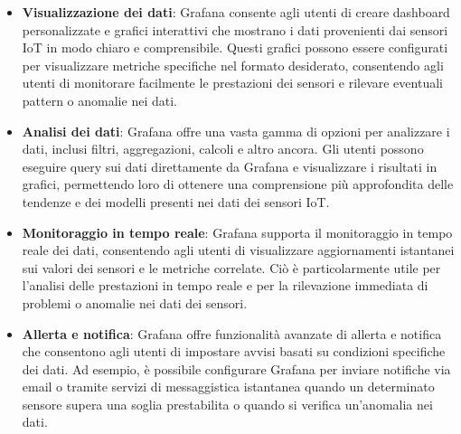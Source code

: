 \begin{itemize}
  \item \textbf{Visualizzazione dei dati}: Grafana consente agli utenti di creare dashboard personalizzate e grafici interattivi che mostrano i dati provenienti dai sensori IoT in modo chiaro e comprensibile. Questi grafici possono essere configurati per visualizzare metriche specifiche nel formato desiderato, consentendo agli utenti di monitorare facilmente le prestazioni dei sensori e rilevare eventuali pattern o anomalie nei dati.
  
  \item \textbf{Analisi dei dati}: Grafana offre una vasta gamma di opzioni per analizzare i dati, inclusi filtri, aggregazioni, calcoli e altro ancora. Gli utenti possono eseguire query sui dati direttamente da Grafana e visualizzare i risultati in grafici, permettendo loro di ottenere una comprensione più approfondita delle tendenze e dei modelli presenti nei dati dei sensori IoT.
  
  \item \textbf{Monitoraggio in tempo reale}: Grafana supporta il monitoraggio in tempo reale dei dati, consentendo agli utenti di visualizzare aggiornamenti istantanei sui valori dei sensori e le metriche correlate. Ciò è particolarmente utile per l'analisi delle prestazioni in tempo reale e per la rilevazione immediata di problemi o anomalie nei dati dei sensori.
  
  \item \textbf{Allerta e notifica}: Grafana offre funzionalità avanzate di allerta e notifica che consentono agli utenti di impostare avvisi basati su condizioni specifiche dei dati. Ad esempio, è possibile configurare Grafana per inviare notifiche via email o tramite servizi di messaggistica istantanea quando un determinato sensore supera una soglia prestabilita o quando si verifica un'anomalia nei dati.
\end{itemize} 